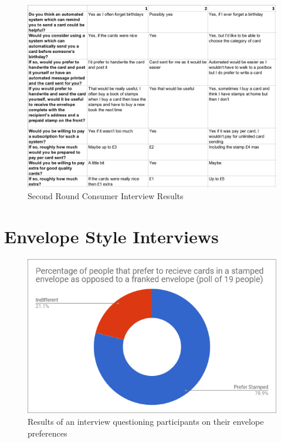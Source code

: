 \documentclass[10pt,a4paper]{article}
\begin{document}
\begin{appendices}
  \begin{figure}[!htb]
\includegraphics[width=1.0\linewidth]{primary_research_3.png}
    \caption{Second Round Consumer Interview Results}
  \end{figure}



\clearpage

\section{Envelope Style Interviews}
\label{app:envelope_style}
  \begin{figure}[!htb]
\includegraphics[width=1.0\linewidth]{envelope_style.png}
    \caption{Results of an interview questioning participants on their envelope preferences}
  \end{figure}



\end{appendices}
\end{document}
